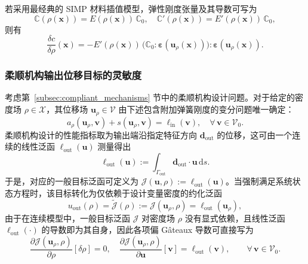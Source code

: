 若采用最经典的 SIMP 材料插值模型，弹性刚度张量及其导数可写为
\[
\mathbb{C}(\rho(\boldsymbol{x})) = E(\rho(\boldsymbol{x}))\,\mathbb{C}_0,\quad\mathbb{C}'(\rho(\boldsymbol{x})) = E'(\rho(\boldsymbol{x}))\,\mathbb{C}_0,
\]
则有
\[
\frac{\delta c}{\delta\rho}(\boldsymbol{x}) = -E'(\rho(\boldsymbol{x}))\, \big(\mathbb{C}_0:\boldsymbol{\varepsilon}(\boldsymbol{u}_\rho(\boldsymbol{x}))\big): \boldsymbol{\varepsilon}(\boldsymbol{u}_\rho(\boldsymbol{x})).
\]


\subsubsection*{柔顺机构输出位移目标的灵敏度}

考虑第~\ref{subsec:compliant_mechanisms} 节中的柔顺机构设计问题。对于给定的密度场 $\rho\in\mathcal{X}$，其位移场 $\boldsymbol{u}_\rho\in\mathcal{V}$ 由下述包含附加弹簧刚度的变分问题唯一确定：
\[
a_\rho(\boldsymbol{u}_\rho,\boldsymbol{v}) + s(\boldsymbol{u}_\rho,\boldsymbol{v}) = \ell_{\mathrm{in}}(\boldsymbol{v}),\quad \forall\,\boldsymbol{v}\in\mathcal{V}_0.
\]
柔顺机构设计的性能指标取为输出端沿指定特征方向 $\boldsymbol{d}_{\mathrm{out}}$ 的位移，这可由一个连续的线性泛函 $\ell_{\mathrm{out}}(\boldsymbol{u})$ 测量得出
\[
\ell_{\mathrm{out}}(\boldsymbol{u}) := \int_{\Gamma_{\mathrm{out}}}\boldsymbol{d}_{\mathrm{out}}\cdot\boldsymbol{u}\,\mathrm{d}s.
\]
于是，对应的一般目标泛函可定义为 $\mathcal{J}(\boldsymbol{u}, \rho) := \ell_{\mathrm{out}}(\boldsymbol{u})$。当强制满足系统状态方程时，该目标转化为仅依赖于设计变量密度的约化泛函
\[
u_{\mathrm{out}}(\rho) = \tilde{\mathcal{J}}(\rho) := \mathcal{J}(\boldsymbol{u}_\rho,\rho) = \ell_{\mathrm{out}}(\boldsymbol{u}_\rho),
\]
由于在连续模型中，一般目标泛函 $\mathcal{J}$ 对密度场 $\rho$ 没有显式依赖，且线性泛函 $\ell_{\mathrm{out}}(\cdot)$ 的导数即为其自身，因此各项偏 Gâteaux 导数可直接写为
\[
\frac{\partial\mathcal{J}(\boldsymbol{u}_\rho,\rho)}{\partial\rho}[\delta\rho] = 0,\quad\frac{\partial\mathcal{J}(\boldsymbol{u}_\rho,\rho)}{\partial\boldsymbol{u}}[\boldsymbol{v}] = \ell_{\mathrm{out}}(\boldsymbol{v}), \qquad \forall\,\boldsymbol{v}\in\mathcal{V}_0.
\]

